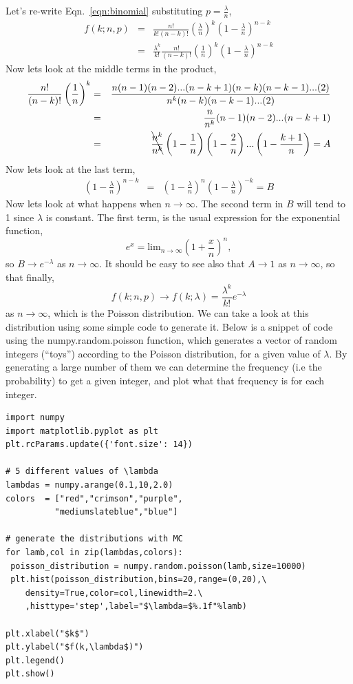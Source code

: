 Let's re-write Eqn.~\ref{eqn:binomial} substituting $p=\frac{\lambda}{n}$, 
\begin{eqnarray}
    f(k;n,p) & = & \frac{n!}{k!(n-k)!}\left(\frac{\lambda}{n}\right)^{k}\left(1-\frac{\lambda}{n}\right)^{n-k}\\
    & = & \frac{\lambda^{k}}{k!}\frac{n!}{(n-k)!}\left(\frac{1}{n}\right)^{k}\left(1-\frac{\lambda}{n}\right)^{n-k}
\end{eqnarray}
Now lets look at the middle terms in the product,
\begin{eqnarray}
    \frac{n!}{(n-k)!}\left(\frac{1}{n}\right)^{k} & = & 
    \frac{n(n-1)(n-2)...(n-k+1)(n-k)(n-k-1)...(2)}
    {n^k(n-k)(n-k-1)...(2)}\\
    & = & \frac{n}{n^{k}}(n-1)(n-2)...(n-k+1)\\
    & = & \bcancel{\frac{n^{k}}{n^{k}}}\left(1-\frac{1}{n}\right)\left(1-\frac{2}{n}\right)...\left(1-\frac{k+1}{n}\right) = A
\end{eqnarray}
Now lets look at the last term, 
\begin{eqnarray}
\left(1-\frac{\lambda}{n}\right)^{n-k} & = & \left(1-\frac{\lambda}{n}\right)^{n}\left(1-\frac{\lambda}{n}\right)^{-k} = B
\end{eqnarray}
Now lets look at what happens when $n\rightarrow \infty$. The second term in $B$ will tend to 1 since $\lambda$ is constant. The first term, is the usual expression for the exponential function, 
\begin{equation}
    e^{x} = \mathrm{lim}_{n\rightarrow\infty}\left(1+\frac{x}{n}\right)^n,
\end{equation}
so $B\rightarrow e^{-\lambda}$ as $n\rightarrow \infty$.
It should be easy to see also that $A\rightarrow 1$ as $n\rightarrow \infty$, so that finally, 
\begin{equation}
    f(k;n,p)  \rightarrow f(k;\lambda) = \frac{\lambda^{k}}{k!}e^{-\lambda}
\end{equation}
as $n\rightarrow \infty$, which is the Poisson distribution. We can take a look at this distribution using some simple code to generate it. Below is a snippet of code using the \textsf{numpy.random.poisson} function, which generates a vector of random integers (``toys'') according to the Poisson distribution, for a given value of $\lambda$. By generating a large number of them we can determine the frequency (i.e the probability) to get a given integer, and plot what that frequency is for each integer. 
\begin{lstlisting}[style = Python]
import numpy
import matplotlib.pyplot as plt
plt.rcParams.update({'font.size': 14})

# 5 different values of \lambda
lambdas = numpy.arange(0.1,10,2.0)
colors  = ["red","crimson","purple",
          "mediumslateblue","blue"]

# generate the distributions with MC
for lamb,col in zip(lambdas,colors):
 poisson_distribution = numpy.random.poisson(lamb,size=10000)
 plt.hist(poisson_distribution,bins=20,range=(0,20),\
    density=True,color=col,linewidth=2.\
    ,histtype='step',label="$\lambda=$%.1f"%lamb)

plt.xlabel("$k$")
plt.ylabel("$f(k,\lambda$)")
plt.legend()
plt.show()
\end{lstlisting}

